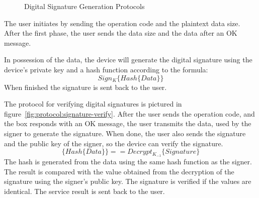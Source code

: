 \begin{figure}[h!]
	\centering     %
	\caption{Digital Signature Generation Protocols}
\end{figure}

The user initiates by sending the operation code and the plaintext data size.
After the first phase, the user sends the data size and the data after an OK message. 

In possession of the data, the device will generate the digital signature using the device's private key and a hash function according to the formula: 
\[Sign_{K}\{Hash\{Data\}\}\]
When finished the signature is sent back to the user.

The protocol for verifying digital signatures is pictured in figure~\ref{fig:protocol:signature-verify}.
After the user sends the operation code, and the box responds with an OK message, the user transmits the data, used by the signer to generate the signature.
When done, the user also sends the signature and the public key of the signer, so the device can verify the signature.
\[\{Hash\{Data\}\} == Decrypt_{K_{-1}}\{Signature\}\]
The hash is generated from the data using the same hash function as the signer. The result is compared with the value obtained from the decryption of the signature using the signer's public key. The signature is verified if the values are identical.
The service result is sent back to the user.

